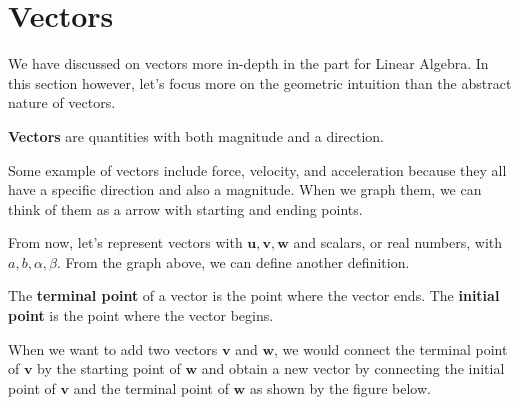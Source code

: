 \documentclass[../../../main.tex]{subfiles}
\begin{document}
\section{Vectors}

We have discussed on vectors more in-depth in the part for Linear
Algebra. In this section however, let's focus more on the geometric
intuition than the abstract nature of vectors.

\begin{definition}{}{}
\textbf{Vectors} are quantities with both magnitude and a direction.
\end{definition}

Some example of vectors include force, velocity, and acceleration
because they all have a specific direction and also a magnitude.
When we graph them, we can think of them as a arrow with starting
and ending points.

\begin{figure}[H]
\centering
{}
\end{figure}

From now, let's represent vectors with $\mathbf{u}, \mathbf{v},
\mathbf{w}$ and scalars, or real numbers, with $a, b, \alpha, \beta$.
From the graph above, we can define another definition.

\begin{definition}{}{}
The \textbf{terminal point} of a vector is the point where the vector
ends. The \textbf{initial point} is the point where the vector begins.
\end{definition}

When we want to add two vectors $\mathbf{v}$ and $\mathbf{w}$,
we would connect the terminal point of $\mathbf{v}$ by the starting
point of $\mathbf{w}$ and obtain a new vector by connecting the
initial point of $\mathbf{v}$ and the terminal point of $\mathbf{w}$
as shown by the figure below.
\end{document}
